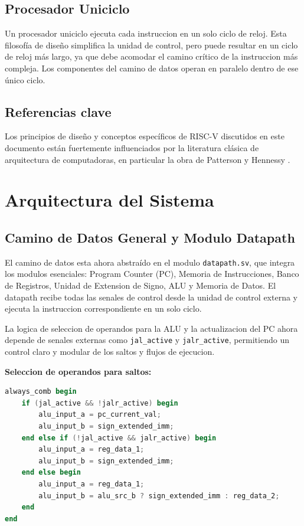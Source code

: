 \documentclass[conference]{IEEEtran}
\begin{document}
\subsection{Procesador Uniciclo}
Un procesador uniciclo ejecuta cada instruccion en un solo ciclo de reloj. Esta filosofía de diseño simplifica la unidad de control, pero puede resultar en un ciclo de reloj más largo, ya que debe acomodar el camino crítico de la instruccion más compleja. Los componentes del camino de datos operan en paralelo dentro de ese único ciclo.

\subsection{Referencias clave}
Los principios de diseño y conceptos específicos de RISC-V discutidos en este documento están fuertemente influenciados por la literatura clásica de arquitectura de computadoras, en particular la obra de Patterson y Hennessy \cite{PattersonHennessy2021RISCV}.

\section{Arquitectura del Sistema}
\label{sec:system_architecture}
\subsection{Camino de Datos General y Modulo Datapath}
El camino de datos esta ahora abstraído en el modulo \texttt{datapath.sv}, que integra los modulos esenciales: Program Counter (PC), Memoria de Instrucciones, Banco de Registros, Unidad de Extension de Signo, ALU y Memoria de Datos. El datapath recibe todas las senales de control desde la unidad de control externa y ejecuta la instruccion correspondiente en un solo ciclo.

La logica de seleccion de operandos para la ALU y la actualizacion del PC ahora depende de senales externas como \texttt{jal\_active} y \texttt{jalr\_active}, permitiendo un control claro y modular de los saltos y flujos de ejecucion.

\textbf{Seleccion de operandos para saltos:}
\begin{lstlisting}[language=Verilog, caption={Seleccion de operandos en datapath.sv}]
always_comb begin
    if (jal_active && !jalr_active) begin
        alu_input_a = pc_current_val;
        alu_input_b = sign_extended_imm;
    end else if (!jal_active && jalr_active) begin
        alu_input_a = reg_data_1;
        alu_input_b = sign_extended_imm;
    end else begin
        alu_input_a = reg_data_1;
        alu_input_b = alu_src_b ? sign_extended_imm : reg_data_2;
    end
end
\end{lstlisting}
\end{document}
